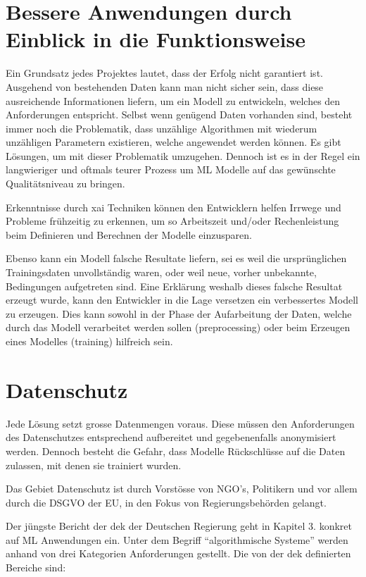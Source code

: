 \documentclass[
  12pt, %
  a4paper, %
  oneside, %
  openany, 
  numbers=noenddot, %
  BCOR=5mm, %
  parskip=half*, %
  thesis, %
]{bfhbook}
\begin{document}
\section{Bessere Anwendungen durch Einblick in die Funktionsweise}
Ein Grundsatz jedes  Projektes lautet, dass der Erfolg nicht garantiert ist. Ausgehend von bestehenden Daten kann man nicht sicher sein, dass diese ausreichende Informationen liefern, um ein Modell zu entwickeln, welches den Anforderungen entspricht. Selbst wenn genügend Daten vorhanden sind, besteht immer noch die Problematik, dass unzählige Algorithmen mit wiederum unzähligen Parametern existieren, welche angewendet werden können. Es gibt Lösungen, um mit dieser Problematik umzugehen. Dennoch ist es in der Regel ein langwieriger und oftmals teurer Prozess um \Gls{ML} Modelle auf das gewünschte Qualitätsniveau zu bringen.

Erkenntnisse durch \gls{xai} Techniken können den Entwicklern helfen Irrwege und Probleme frühzeitig zu erkennen, um so Arbeitszeit und/oder Rechenleistung beim Definieren und Berechnen der Modelle einzusparen.

Ebenso kann ein Modell falsche Resultate liefern, sei es weil die ursprünglichen Trainingsdaten unvollständig waren, oder weil neue, vorher unbekannte, Bedingungen aufgetreten sind. Eine Erklärung weshalb dieses falsche Resultat erzeugt wurde, kann den Entwickler in die Lage versetzen ein verbessertes Modell zu erzeugen. Dies kann sowohl in der Phase der Aufarbeitung der Daten, welche durch das Modell verarbeitet werden sollen (preprocessing) oder beim Erzeugen eines Modelles (training) hilfreich sein.

\section{Datenschutz}
Jede  Lösung setzt grosse Datenmengen voraus. Diese müssen den Anforderungen des Datenschutzes entsprechend aufbereitet und gegebenenfalls anonymisiert werden. Dennoch besteht die Gefahr, dass Modelle Rückschlüsse auf die Daten zulassen, mit denen sie trainiert wurden.

Das Gebiet Datenschutz ist durch Vorstösse von NGO's, Politikern und vor allem durch die \acrfull{DSGVO} der EU, in den Fokus von Regierungsbehörden gelangt.

Der jüngste Bericht der \acrfull{dek} der Deutschen Regierung \parencite{datenEthik} geht in Kapitel 3. konkret auf  \Gls{ML} Anwendungen ein.
\break
Unter dem Begriff ``algorithmische Systeme'' werden anhand von drei Kategorien Anforderungen gestellt.
\break
 Die von der  \acrshort{dek} definierten Bereiche sind:
 
\end{document}
